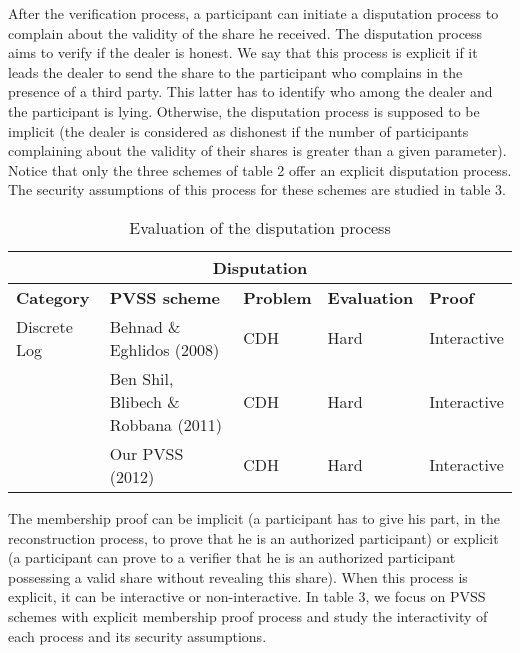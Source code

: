 \documentclass[submission,copyright,creativecommons]{eptcs}
\begin{document}
After the verification process, a participant can initiate a disputation
process to complain about the validity of the share he received. The
disputation process aims to verify if the dealer is honest. We say that this
process is explicit if it leads the dealer to send the share to the
participant who complains in the presence of a third party. This latter has
to identify who among the dealer and the participant is lying. Otherwise,
the disputation process is supposed to be implicit (the dealer is considered
as dishonest if the number of participants complaining about the validity of
their shares is greater than a given parameter). Notice that only the three
schemes of table 2 offer an explicit disputation process. The security
assumptions of this process for these schemes are studied in table 3.

\begin{table*}[tbp] \centering \begin{tabular}{|p{1.9cm}||p{3cm}||p{1.5cm}||p{1.7cm}||p{1.7cm}|}
\hline
\multicolumn{5}{|c|}{\textbf{Disputation}} \\ \hline
\textbf{Category} & \textbf{PVSS scheme} & \textbf{Problem} & \textbf{Evaluation} & \textbf{Proof} \\ \hline
\multirow{1}{*}{Discrete Log} & Behnad \& Eghlidos (2008) & CDH & Hard & 
Interactive \\ \cline{2-5}
& Ben Shil, Blibech \& Robbana (2011) & CDH & Hard & Interactive \\ 
\cline{2-5}
& Our PVSS (2012) & CDH & Hard & Interactive \\ \hline
\end{tabular}\caption{Evaluation of the disputation process}\label{Evaluation of the
disputation process}\end{table*}The membership proof can be implicit (a participant has to give his part, in
the reconstruction process, to prove that he is an authorized participant)
or explicit (a participant can prove to a verifier that he is an authorized
participant possessing a valid share without revealing this share). When
this process is explicit, it can be interactive or non-interactive. In table
3, we focus on PVSS schemes with explicit membership proof process and study
the interactivity of each process and its security assumptions.
\end{document}
